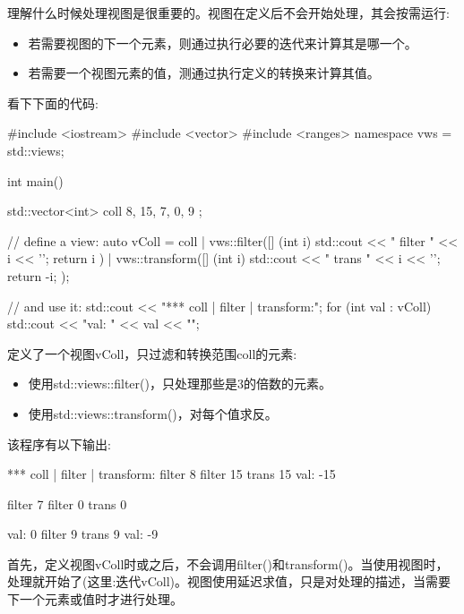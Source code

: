 
理解什么时候处理视图是很重要的。视图在定义后不会开始处理，其会按需运行:

\begin{itemize}
\item
若需要视图的下一个元素，则通过执行必要的迭代来计算其是哪一个。

\item
若需要一个视图元素的值，测通过执行定义的转换来计算其值。
\end{itemize}

看下下面的代码:


\begin{cpp}
#include <iostream>
#include <vector>
#include <ranges>
namespace vws = std::views;

int main()
{
	std::vector<int> coll{ 8, 15, 7, 0, 9 };
	
	// define a view:
	auto vColl = coll
				| vws::filter([] (int i) {
					std::cout << " filter " << i << '\n';
					return i %
				})
				| vws::transform([] (int i) {
					std::cout << " trans " << i << '\n';
					return -i;
				});
				
	// and use it:
	std::cout << "*** coll | filter | transform:\n";
	for (int val : vColl) {
		std::cout << "val: " << val << "\n\n";
	}
}
\end{cpp}

定义了一个视图vColl，只过滤和转换范围coll的元素:

\begin{itemize}
\item
使用std::views::filter()，只处理那些是3的倍数的元素。

\item
使用std::views::transform()，对每个值求反。
\end{itemize}

该程序有以下输出:

\begin{shell}
*** coll | filter | transform:
filter 8
filter 15
trans 15
val: -15

filter 7
filter 0
trans 0

val: 0
filter 9
trans 9
val: -9
\end{shell}

首先，定义视图vColl时或之后，不会调用filter()和transform()。当使用视图时，处理就开始了(这里:迭代vColl)。视图使用延迟求值，只是对处理的描述，当需要下一个元素或值时才进行处理。

